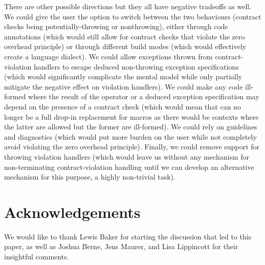 There are other possible directions but they all have negative tradeoffs as well. We could give the user the option to switch between the two behaviours (contract checks being potentially-throwing or nonthrowing), either through code annotations (which would still allow for contract checks that violate the zero overhead principle) or through different build modes (which would effectively create a language dialect). We could allow exceptions thrown from contract-violation handlers to escape deduced non-throwing exception specifications (which would significantly complicate the mental model while only partially mitigate the negative effect on violation handlers). We could  make any code ill-formed where the result of the  operator or a deduced exception specification may depend on the presence of a contract check (which would mean that  can no longer be a full drop-in replacement for  macros as there would be contexts where the latter are allowed but the former are ill-formed). We could rely on guidelines and diagnostics (which would put more burden on the user while not completely avoid violating the zero overhead principle). Finally, we could remove support for throwing violation handlers (which would leave us without any mechanism for non-terminating contract-violation handling until we can develop an alternative mechanism for this purpose, a highly non-trivial task).




\section*{Acknowledgements}
We would like to thank Lewis Baker for starting the discussion that led to this paper, as well as Joshua Berne, Jens Maurer, and Lisa Lippincott for their insightful comments.

\renewcommand{\bibname}{References}




